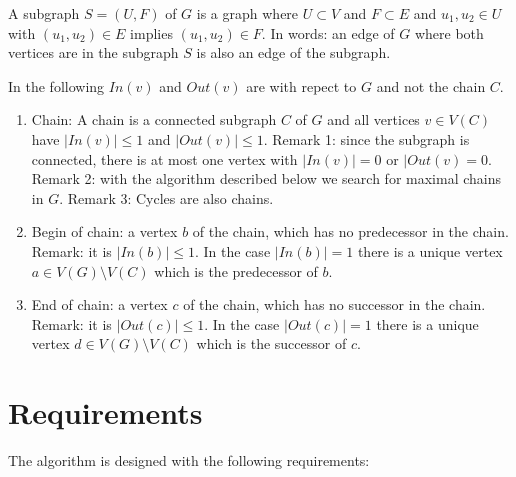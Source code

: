 \documentclass[12pt,a4paper]{report}
\begin{document}
A subgraph $S = (U,F)$ of $G$ is a graph where $U \subset V$ and $F \subset E$ and $u_1, u_2 \in U$
with $(u_1, u_2) \in E$ implies $(u_1, u_2) \in F$. In words: an edge of $G$ where both vertices
are in the subgraph $S$ is also an edge of the subgraph.

In the following $In(v)$ and $Out(v)$ are with repect to $G$ and not the chain $C$.

\begin{enumerate}
\item Chain: A chain is a connected subgraph $C$ of $G$ and all vertices $v\in V(C)$ have
$|In(v)| \le 1$ and $|Out(v)| \le 1$. Remark 1: since the subgraph is connected, there is at most
one vertex with $|In(v)| = 0$ or $|Out(v) = 0$. Remark 2: with the algorithm described below we
search for maximal chains in $G$. Remark 3: Cycles are also chains.

\item Begin of chain: a vertex $b$ of the chain, which has no predecessor in the chain.
Remark: it is $|In(b)| \le 1$. In the case $|In(b)| = 1$ there is a unique vertex
$a \in V(G) \setminus V(C)$ which is the predecessor of $b$.

\item End of chain: a vertex $c$ of the chain, which has no successor in the chain.
Remark: it is $|Out(c)| \le 1$. In the case $|Out(c)| = 1$ there is a unique vertex
$d \in V(G) \setminus V(C)$ which is the successor of $c$.

\end{enumerate}

\chapter{Requirements}
The algorithm is designed with the following requirements:
\end{document}
